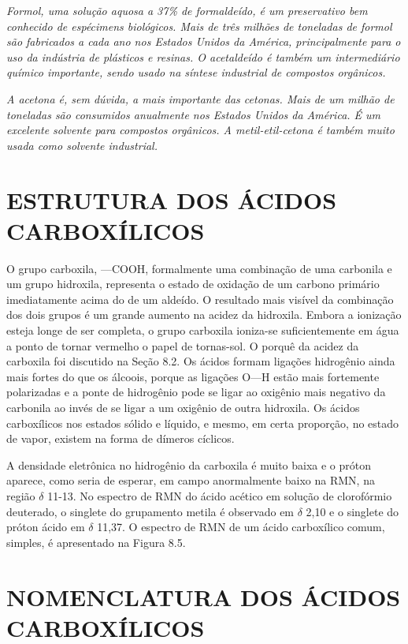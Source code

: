 \emph{Formol, uma solução aquosa a 37\% de formaldeído, é um preservativo bem conhecido de espécimens biológicos. Mais de três milhões de toneladas de formol são fabricados a cada ano nos Estados Unidos da América, principalmente para o uso da indústria de plásticos e resinas. O acetaldeído é também um intermediário químico importante, sendo usado na síntese industrial de compostos orgânicos.}

\emph{A acetona é, sem dúvida, a mais importante das cetonas. Mais de um milhão de toneladas são consumidos anualmente nos Estados Unidos da América. É um excelente solvente para compostos orgânicos. A metil-etil-cetona é também muito usada como solvente industrial.}
\par\bigskip

\section{ESTRUTURA DOS ÁCIDOS CARBOXÍLICOS}

O grupo carboxila, —COOH, formalmente uma combinação de uma carbonila e um grupo hidroxila, representa o estado de oxidação de um carbono primário imediatamente acima do de um aldeído. O resultado mais visível da combinação dos dois grupos é um grande aumento na acidez da hidroxila. Embora a ionização esteja longe de ser completa, o grupo carboxila ioniza-se suficientemente em água a ponto de tornar vermelho o papel de tornas-sol. O porquê da acidez da carboxila foi discutido na Seção 8.2. Os ácidos formam ligações hidrogênio ainda mais fortes do que os álcoois, porque as ligações O—H estão mais fortemente polarizadas e a ponte de hidrogênio pode se ligar ao oxigênio mais negativo da carbonila ao invés de se ligar a um oxigênio de outra hidroxila. Os ácidos carboxílicos nos estados sólido e líquido, e mesmo, em certa proporção, no estado de vapor, existem na forma de dímeros cíclicos. 

A densidade eletrônica no hidrogênio da carboxila é muito baixa e o próton aparece, como seria de esperar, em campo anormalmente baixo na RMN, na região $\delta$ 11-13. No espectro de RMN do ácido acético em solução de clorofórmio deuterado, o singlete do grupamento metila é observado em $\delta$ 2,10 e o singlete do próton ácido em $\delta$ 11,37. O espectro de RMN de um ácido carboxílico comum, simples, é apresentado na Figura 8.5.

\section{NOMENCLATURA DOS ÁCIDOS CARBOXÍLICOS}

